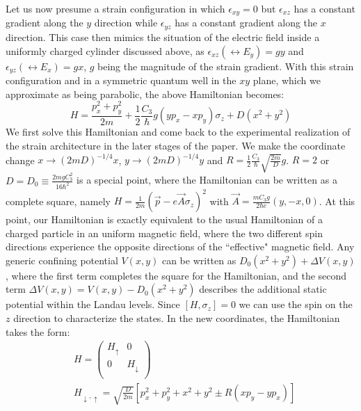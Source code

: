 \documentclass[prl,aps,amssymb,shownopacs,twocolumn]{revtex4}
\begin{document}
	Let us now presume a strain configuration in which $\epsilon_{xy}
	= 0$ but $\epsilon_{xz}$ has a constant gradient along the $y$
	direction while $\epsilon_{yz}$ has a constant gradient along the
	$x$ direction. This case then mimics the situation of the electric
	field inside a uniformly charged cylinder discussed above, as
	$\epsilon_{xz} (\leftrightarrow E_y) =g y$ and $\epsilon_{yz}
	(\leftrightarrow E_x) = g x$, $g$ being the magnitude of the
	strain gradient. With this strain configuration and in a symmetric
	quantum well in the $xy$ plane, which we approximate as being
	parabolic, the above Hamiltonian becomes:
	\begin{equation}
		H= \frac{p_x^2 + p_y^2}{2m} + \frac{1}{2} \frac{C_3}{\hbar}g (y p_x
		- x  p_y)\sigma_z + D(x^2 + y^2)
	\end{equation}
	\noindent We first solve this Hamiltonian and come back to the
	experimental realization of the strain architecture in the later
	stages of the paper. We make the coordinate change $x \rightarrow
	(2mD)^{-1/4} x$, $y \rightarrow (2mD)^{-1/4} y$ and $R =
	\frac{1}{2} \frac{C_3}{\hbar} \sqrt{\frac{2m}{D}} g$. $R=2$ or
	$D=D_0\equiv\frac{2mgC_3^2}{16\hbar^2}$ is a special point, where
	the Hamiltonian can be written as a complete square, namely $H =
	\frac{1}{2m} (\vec{p} - e \vec{A} \sigma_z)^2$ with ${\vec{A} =
		\frac{m C_3 g}{2 \hbar e}(y, -x, 0)}$. At this point, our
	Hamiltonian is exactly equivalent to the usual Hamiltonian of a
	charged particle in an uniform magnetic field, where the two
	different spin directions experience the opposite directions of
	the ``effective" magnetic field. Any generic confining potential
	$V(x,y)$ can be written as $D_0(x^2 + y^2) + \Delta V(x,y)$, where
	the first term completes the square for the Hamiltonian, and the
	second term $\Delta V(x,y)=V(x,y)-D_0(x^2 + y^2)$ describes the
	additional static potential within the Landau levels. Since $[H,
	\sigma_z] =0$ we can use the spin on the $z$ direction to
	characterize the states. In the new coordinates, the Hamiltonian
	takes the form:
	\begin{eqnarray}
		& H = \left(%
		\begin{array}{cc}
			H_{\uparrow} & 0 \\
		\label{key}	0 & H_{\downarrow} \\
		\end{array}%
		\right) \nonumber \\ & H_{ \downarrow , \uparrow} =
		\sqrt{\frac{D}{2m}} [p_x^2 + p_y^2 + x^2+ y^2 \pm R(x p_y - y p_x)]
	\end{eqnarray}
\end{document}
